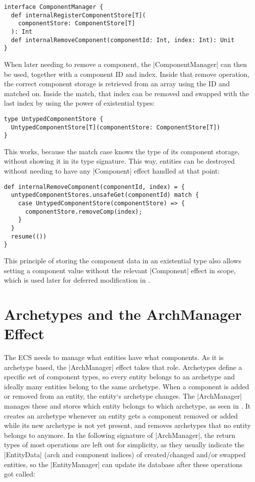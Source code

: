 \begin{lstlisting}[caption=ComponentManager signature]
interface ComponentManager {
  def internalRegisterComponentStore[T](
    componentStore: ComponentStore[T]
  ): Int
  def internalRemoveComponent(componentId: Int, index: Int): Unit
}
\end{lstlisting}

When later needing to remove a component, the |ComponentManager| can then be used, together with a component ID and index. Inside that remove operation, the correct component storage is retrieved from an array using the ID and matched on. Inside the match, that index can be removed and swapped with the last index by using the power of existential types:

\begin{lstlisting}
type UntypedComponentStore {
  UntypedComponentStore[T](componentStore: ComponentStore[T])
}
\end{lstlisting}

This works, because the match case knows the type of its component storage, without showing it in its type signature. This way, entities can be destroyed without needing to have any |Component| effect handled at that point:

\begin{lstlisting}
def internalRemoveComponent(componentId, index) = {
  untypedComponentStores.unsafeGet(componentId) match {
    case UntypedComponentStore(componentStore) => {
      componentStore.removeComp(index);
    }
  }
  resume(())
}
\end{lstlisting}

This principle of storing the component data in an existential type also allows setting a component value without the relevant |Component| effect in scope, which is used later for deferred modification in .

\section{Archetypes and the ArchManager Effect}

The ECS needs to manage what entities have what components. As it is archetype based, the |ArchManager| effect takes that role. Archetypes define a specific set of component types, so every entity belongs to an archetype and ideally many entities belong to the same archetype. When a component is added or removed from an entity, the entity`s archetype changes. The |ArchManager| manages these and stores which entity belongs to which archetype, as seen in . It creates an archetype whenever an entity gets a component removed or added while its new archetype is not yet present, and removes archetypes that no entity belongs to anymore. In the following signature of |ArchManager|, the return types of most operations are left out for simplicity, as they usually indicate the |EntityData| (arch and component indices) of created/changed and/or swapped entities, so the |EntityManager| can update its database after these operations got called:

